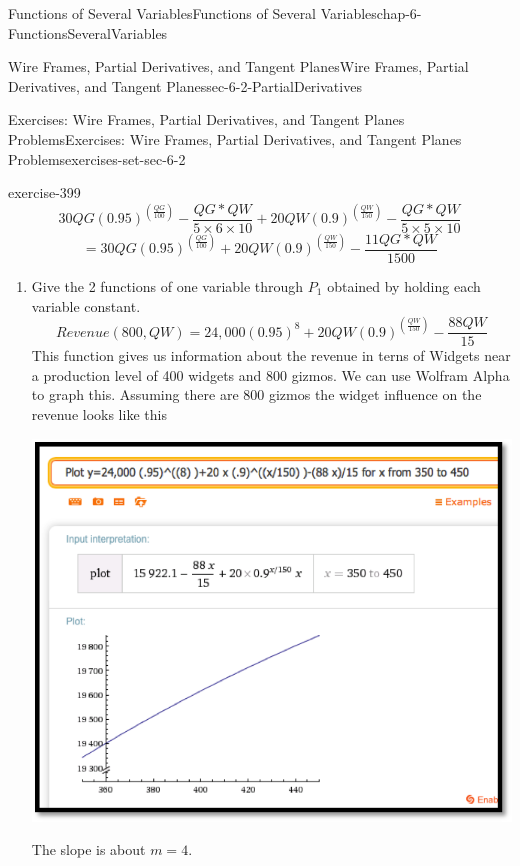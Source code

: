 \documentclass[oneside,10pt,]{book}
\numberwithin{equation}{section}
\begin{document}
\begin{chapterptx}{Functions of Several Variables}{}{Functions of Several Variables}{}{}{chap-6-FunctionsSeveralVariables}
\begin{sectionptx}{Wire Frames, Partial Derivatives, and Tangent Planes}{}{Wire Frames, Partial Derivatives, and Tangent Planes}{}{}{sec-6-2-PartialDerivatives}
\begin{exercises-subsection-numberless}{Exercises: Wire Frames, Partial Derivatives, and Tangent Planes Problems}{}{Exercises: Wire Frames, Partial Derivatives, and Tangent Planes Problems}{}{}{exercises-set-sec-6-2}
\begin{exercisegroup}
\begin{divisionexerciseeg}{5}{}{}{exercise-399}
\begin{equation*}
30 QG (0.95)^{\left(\frac{QG}{100}\right)}-\frac{QG *QW}{5×6×10}+20 QW (0.9)^{\left(\frac{QW}{150}\right)}-\frac{QG *QW}{5×5×10}
\end{equation*}
%
\begin{equation*}
= 30 QG (0.95)^{\left(\frac{QG}{100}\right)}+20 QW (0.9)^{\left(\frac{QW}{150}\right)}-\frac{11 QG*QW}{1500}
\end{equation*}
\leavevmode%
\begin{enumerate}[label=(\alph*)]
\item\hypertarget{li-627}{}\hypertarget{p-2270}{}%
Give the 2 functions of one variable through \(P_1\) obtained by holding each variable constant.%
%
\begin{equation*}
Revenue(800,QW)= 24,000 (0.95)^8+20 QW (0.9)^{\left(\frac{QW}{150}\right)}-\frac{88 QW}{15}
\end{equation*}
\hypertarget{p-2271}{}%
This function gives us information about the revenue in terns of Widgets near a production level of 400 widgets and 800 gizmos. We can use Wolfram Alpha to graph this. Assuming there are 800 gizmos the widget influence on the revenue looks like this%
\begin{sidebyside}{1}{0.2}{0.2}{0}%
\begin{sbspanel}{0.6}%
\includegraphics[width=1\linewidth]{images/sec6-2-sol5a.png}
\end{sbspanel}%
\end{sidebyside}%
\par
\hypertarget{p-2272}{}%
The slope is about \(m = 4\).%
%
\begin{equation*}

\end{equation*}
\end{enumerate}
\end{divisionexerciseeg}
\end{exercisegroup}
\end{exercises-subsection-numberless}
\end{sectionptx}
\end{chapterptx}
\end{document}
